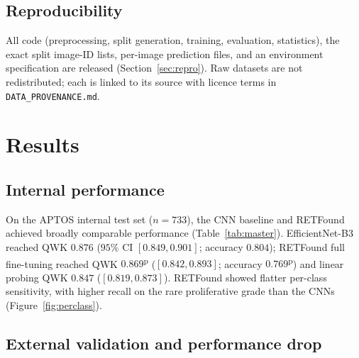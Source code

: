 \documentclass[journal]{IEEEtran}
\newcommand{\pv}[1]{#1\textsuperscript{p}}
\begin{document}
\subsection{Reproducibility}
\label{sec:methods-repro}

All code (preprocessing, split generation, training, evaluation, statistics), the
exact split image-ID lists, per-image prediction files, and an environment
specification are released (Section~\ref{sec:repro}). Raw datasets are not
redistributed; each is linked to its source with licence terms in
\texttt{DATA\_PROVENANCE.md}.


\section{Results}
\label{sec:results}

\subsection{Internal performance}
\label{sec:results-int}

On the APTOS internal test set ($n=733$), the CNN baseline and RETFound achieved
broadly comparable performance (Table~\ref{tab:master}). EfficientNet-B3 reached
QWK $0.876$ ($95\%$ CI $[0.849,0.901]$; accuracy $0.804$); RETFound full
fine-tuning reached QWK \pv{$0.869$} ($[0.842,0.893]$; accuracy \pv{$0.769$}) and
linear probing QWK $0.847$ ($[0.819,0.873]$). RETFound showed flatter per-class
sensitivity, with higher recall on the rare proliferative grade than the CNNs
(Figure~\ref{fig:perclass}).

\subsection{External validation and performance drop}
\label{sec:results-ext}
\end{document}
